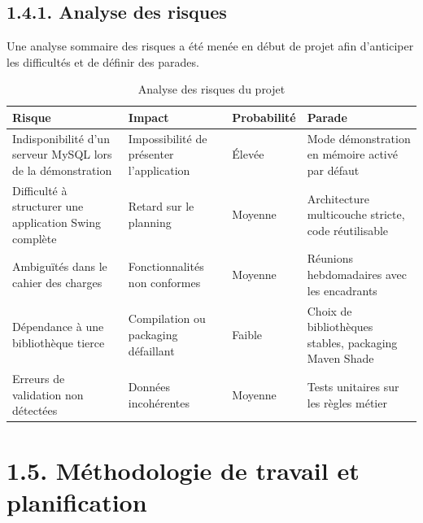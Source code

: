 \documentclass[11pt,a4paper]{report}
\begin{document}
\subsection*{1.4.1. Analyse des risques}

Une analyse sommaire des risques a été menée en début de projet afin d'anticiper les difficultés et de définir des parades.
\begin{table}[htbp]\centering\small
\begin{tabularx}{\textwidth}{|X|X|X|X|}
\hline\rowcolor{hdr}\textbf{Risque} & \textbf{Impact} & \textbf{Probabilité} & \textbf{Parade}\\ \hline
Indisponibilité d'un serveur MySQL lors de la démonstration & Impossibilité de présenter l'application & Élevée & Mode démonstration en mémoire activé par défaut\\ \hline
Difficulté à structurer une application Swing complète & Retard sur le planning & Moyenne & Architecture multicouche stricte, code réutilisable\\ \hline
Ambiguïtés dans le cahier des charges & Fonctionnalités non conformes & Moyenne & Réunions hebdomadaires avec les encadrants\\ \hline
Dépendance à une bibliothèque tierce & Compilation ou packaging défaillant & Faible & Choix de bibliothèques stables, packaging Maven Shade\\ \hline
Erreurs de validation non détectées & Données incohérentes & Moyenne & Tests unitaires sur les règles métier\\ \hline
\end{tabularx}
\caption{Analyse des risques du projet}
\end{table}
\section*{1.5. Méthodologie de travail et planification}
\end{document}
